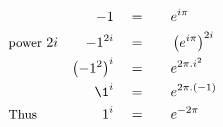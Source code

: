 \begin{alignat*}{5}
&\,&-1\quad&=\quad&&e^{i\pi}\\
&\small\text{power }2i&-1^{2i}\normalsize\quad&=&&\left(e^{i\pi}\right)^{2i}\\
&\,&\left(-1^2\right)^i\quad&=&&e^{2\pi.i^2}\\
&\,&\1^i\quad&=&&e^{2\pi.(-1)}\\
&\small\text{Thus}&1^i\quad&=&&e^{-2\pi}
\end{alignat*}
